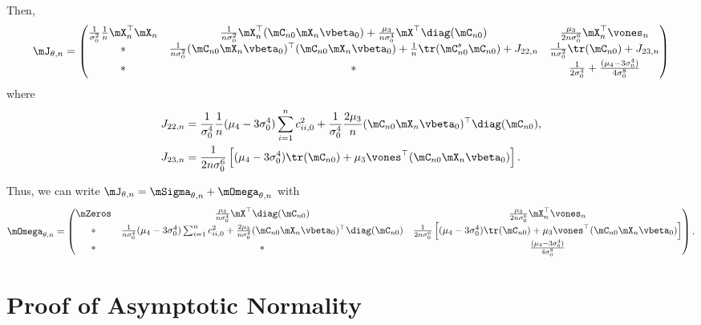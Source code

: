 \documentclass[english,12pt]{book}\usepackage[]{graphicx}\usepackage[]{xcolor}
\begin{document}
\begin{subappendices}
Then, 
\begin{equation*}
\mJ_{\theta, n} = 
\begin{pmatrix}
  \frac{1}{\sigma_0^2}\frac{1}{n}\mX_n^\top\mX_n & \frac{1}{n\sigma_0^2}\mX_n^\top(\mC_{n0}\mX_n\vbeta_0) + \frac{\mu_3}{n\sigma_0^4}\mX^\top\diag(\mC_{n0}) & \frac{\mu_3}{2n\sigma_0^6}\mX_n^\top\vones_n \\
  *  & \frac{1}{n\sigma_0^2}(\mC_{n0}\mX_n\vbeta_0)^\top(\mC_{n0}\mX_n\vbeta_0) + \frac{1}{n}\tr(\mC_{n0}^s\mC_{n0}) +  J_{22, n} & \frac{1}{n\sigma_0^2}\tr(\mC_{n0})+ J_{23,n} \\
  * & * & \frac{1}{2\sigma_0^4}+ \frac{(\mu_4 - 3\sigma_0^4)}{4\sigma_0^8}
\end{pmatrix}
\end{equation*}
%
where 
\begin{align*}
J_{22, n} & = \frac{1}{\sigma_0^4}\frac{1}{n}(\mu_4 - 3\sigma^4_0)\sum_{i = 1}^nc_{ii,0}^2 + \frac{1}{\sigma_0^4}\frac{2\mu_3}{n}(\mC_{n0}\mX_n\vbeta_0)^\top\diag(\mC_{n0}), \\
J_{23, n} &= \frac{1}{2n\sigma_0^6}\left[(\mu_4 - 3\sigma_0^4)\tr(\mC_{n0}) + \mu_3\vones^\top(\mC_{n0}\mX_n\vbeta_0)\right].
\end{align*}

Thus, we can write $\mJ_{\theta, n} = \mSigma_{\theta, n} + \mOmega_{\theta, n}$ with
\scriptsize
\begin{equation*}
\mOmega_{\theta, n} = 
\begin{pmatrix}
  \mZeros & \frac{\mu_3}{n\sigma_0^4}\mX^\top\diag(\mC_{n0}) & \frac{\mu_3}{2n\sigma_0^6}\mX_n^\top\vones_n \\
  * & \frac{1}{n\sigma_0^4}(\mu_4 - 3\sigma^4_0)\sum_{i = 1}^nc_{ii,0}^2 + \frac{2\mu_3}{n\sigma_0^4}(\mC_{n0}\mX_n\vbeta_0)^\top\diag(\mC_{n0}) & \frac{1}{2n\sigma_0^6}\left[(\mu_4 - 3\sigma_0^4)\tr(\mC_{n0}) + \mu_3\vones^\top(\mC_{n0}\mX_n\vbeta_0)\right] \\
  * & * & \frac{(\mu_4 - 3\sigma_0^4)}{4\sigma_0^8}
\end{pmatrix}.
\end{equation*}
\normalsize


 \section{Proof of Asymptotic Normality}\label{appendix-asymptotic normality}


\end{subappendices}
\end{document}
